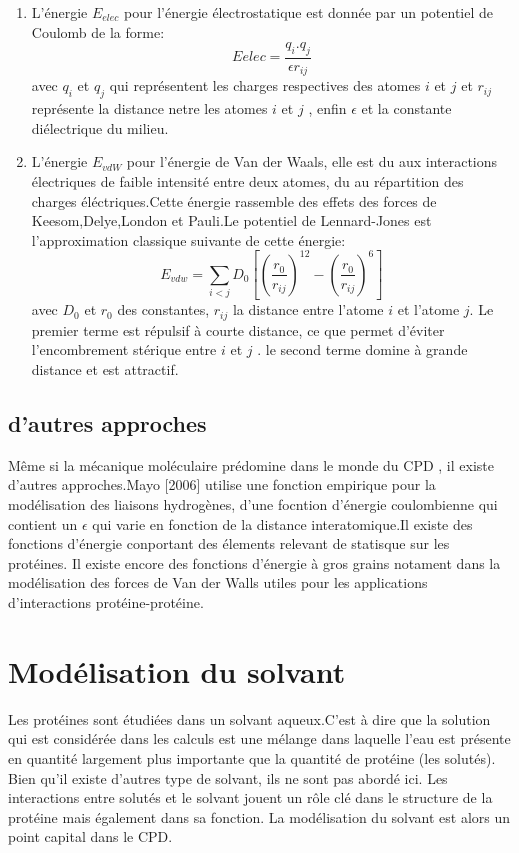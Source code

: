 \begin{enumerate}
  \label{VdW}
\item L'énergie $E_{elec}$ pour l'énergie électrostatique est donnée par un potentiel de Coulomb de la forme:
  \begin{equation}
    E{elec}=\frac{q_i.q_j}{\epsilon r_{ij}}
  \end{equation}
  avec $q_i$ et $q_j$ qui représentent les charges respectives des atomes $i$ et $j$ et $r_{ij}$ représente la distance netre les atomes $i$ et $j$ , enfin $\epsilon$ et la constante diélectrique du milieu.
\item L'énergie  $E_{vdW}$ pour l'énergie de Van der Waals, elle est du aux interactions électriques de faible intensité entre deux atomes, du au répartition des charges éléctriques.Cette énergie rassemble des effets des forces de Keesom,Delye,London et Pauli.Le potentiel de Lennard-Jones est l'approximation classique suivante de cette énergie:
  \begin{equation}
  E_{vdw} = \sum_{i<j}D_0 [(\frac{r_0}{r_{ij}})^12 - (\frac{r_0}{r_{ij}})^6]  
  \end{equation}
avec $D_0$ et $r_0$ des constantes, $r_{ij}$ la distance entre l'atome $i$ et l'atome $j$. Le premier terme est répulsif à courte distance, ce que permet d'éviter l'encombrement stérique entre $i$ et $j$ . le second terme domine à grande distance et est attractif. 
  
\end{enumerate}


\subsection{d'autres approches}

Même si la mécanique moléculaire prédomine dans le monde du CPD , il existe d'autres approches.Mayo [2006] utilise une fonction empirique pour la modélisation des liaisons hydrogènes, d'une focntion d'énergie coulombienne qui contient un $\epsilon$ qui varie en fonction de la distance interatomique.Il existe des fonctions d'énergie  conportant des élements relevant de statisque sur les protéines. Il existe encore des fonctions d'énergie à gros grains notament dans la modélisation des forces de Van der Walls utiles pour les applications d'interactions protéine-protéine.

\section{Modélisation du solvant}
Les protéines sont étudiées dans un solvant aqueux.C'est à dire que la solution qui est considérée dans les calculs est une mélange dans laquelle l'eau est présente en quantité largement plus importante que la quantité de protéine (les solutés). Bien qu'il existe d'autres type de solvant, ils ne sont pas abordé ici. Les interactions entre solutés et le solvant jouent un rôle clé dans le structure de la protéine mais également dans sa fonction. La modélisation du solvant est alors un point capital dans le CPD.


